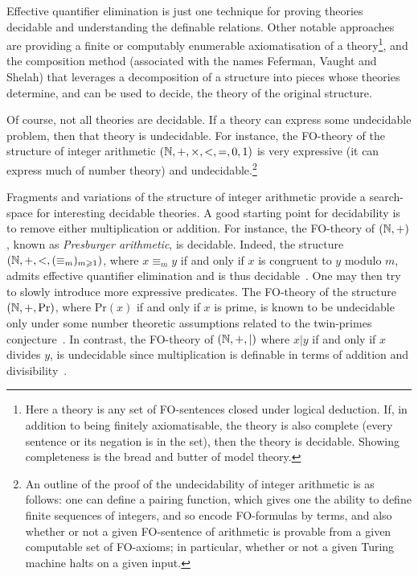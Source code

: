 Effective quantifier elimination is just one technique for proving theories decidable and understanding the definable relations. Other notable approaches
are providing a finite or computably enumerable axiomatisation of a theory\footnote{Here a theory is any set of FO-sentences closed under logical deduction. If, in addition to being finitely axiomatisable, the theory is also complete (every sentence or its negation is in the set), then the theory is decidable. Showing completeness is the bread and butter of model theory.}, and  the composition method
(associated with the names Feferman, Vaught and Shelah) that leverages a decomposition of a structure into pieces whose theories determine, 
and can be used to decide, the theory of the original structure.

Of course, not all theories are decidable. If a theory can express some undecidable problem, then that theory is undecidable. For instance, the FO-theory of the structure of integer arithmetic $(\mathbb{N},+,\times,<,=,0,1)$ is very expressive (it can express much of number theory) and undecidable.\footnote{An outline of the proof of the undecidability of integer arithmetic is as follows: one can define a pairing function, which gives one the ability to define finite sequences of integers, and so encode FO-formulas by terms, and also whether or not a given FO-sentence of arithmetic is provable from a given computable set of FO-axioms; in particular, whether or not a given Turing machine halts on a given input.} 


Fragments and variations of the structure of integer arithmetic provide a search-space for interesting decidable theories.
A good starting point for decidability is to remove either multiplication or addition. For instance, the FO-theory of $(\mathbb{N},+)$, known as {\em Presburger arithmetic},  is decidable. Indeed, the structure $(\mathbb{N},+,<,(\equiv_m)_{m \geqslant 1})$, where $x \equiv_m y$ if and only if $x$ is congruent to $y$ modulo $m$, admits effective quantifier elimination and is thus decidable~\cite{Pres29}.
 One may then try to slowly introduce more expressive predicates. The FO-theory of the structure $(\mathbb{N},+,\text{Pr})$, where $\text{Pr}(x)$ if and only if $x$ is prime, is known to be undecidable only under some number theoretic assumptions related to the twin-primes conjecture~\cite{BJW93}. In contrast, the FO-theory of $(\mathbb{N},+,|)$ where $x | y$ if and only if $x$ divides $y$, is undecidable since multiplication is definable in terms of addition and divisibility~\cite{Tars49}.

